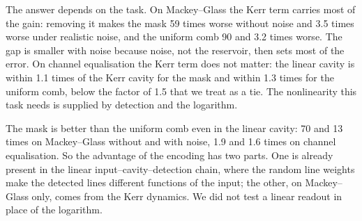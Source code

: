 The answer depends on the task. On Mackey--Glass the Kerr term carries most of the gain: removing it makes the mask 59 times worse
without noise and 3.5 times worse under realistic noise, and the uniform comb 90 and 3.2 times worse. The gap is smaller with noise
because noise, not the reservoir, then sets most of the error. On channel equalisation the Kerr term does not matter: the linear
cavity is within 1.1 times of the Kerr cavity for the mask and within 1.3 times for the uniform comb, below the factor of 1.5 that
we treat as a tie. The nonlinearity this task needs is supplied by detection and the logarithm.

The mask is better than the uniform comb even in the linear cavity: 70 and 13 times on Mackey--Glass without and with noise, 1.9 and
1.6 times on channel equalisation. So the advantage of the encoding has two parts. One is already present in the linear
input--cavity--detection chain, where the random line weights make the detected lines different functions of the input; the other,
on Mackey--Glass only, comes from the Kerr dynamics. We did not test a linear readout in place of the logarithm.
